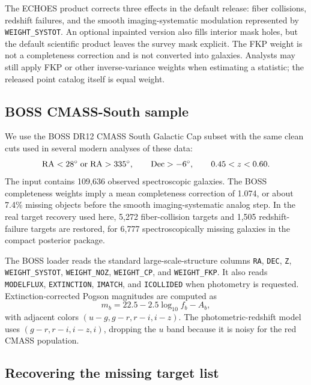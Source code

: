 \documentclass[apj]{emulateapj}
\begin{document}
The ECHOES product corrects three effects in the default release: fiber collisions,
redshift failures, and the smooth imaging-systematic modulation represented by
\texttt{WEIGHT\_SYSTOT}.  An optional inpainted version also fills interior mask
holes, but the default scientific product leaves the survey mask explicit.  The
FKP weight \citep{FKP1994} is not a completeness correction and is not converted
into galaxies.  Analysts may still apply FKP or other inverse-variance weights
when estimating a statistic; the released point catalog itself is equal weight.

\subsection{BOSS CMASS-South sample}
\label{subsec:bossdata}

We use the BOSS DR12 CMASS South Galactic Cap subset with the same clean cuts
used in several modern analyses of these data:
\begin{equation}
  {\rm RA}<28^\circ \; {\rm or} \; {\rm RA}>335^\circ,\qquad
  {\rm Dec}>-6^\circ,\qquad
  0.45<z<0.60 .
\end{equation}
The input contains 109,636 observed spectroscopic galaxies.  The BOSS
completeness weights imply a mean completeness correction of 1.074, or about
7.4\% missing objects before the smooth imaging-systematic analog step.  In the
real target recovery used here, 5,272 fiber-collision targets and 1,505
redshift-failure targets are restored, for 6,777 spectroscopically missing
galaxies in the compact posterior package.

The BOSS loader reads the standard large-scale-structure columns
\texttt{RA}, \texttt{DEC}, \texttt{Z}, \texttt{WEIGHT\_SYSTOT},
\texttt{WEIGHT\_NOZ}, \texttt{WEIGHT\_CP}, and \texttt{WEIGHT\_FKP}.  It also
reads \texttt{MODELFLUX}, \texttt{EXTINCTION}, \texttt{IMATCH}, and
\texttt{ICOLLIDED} when photometry is requested.  Extinction-corrected
Pogson magnitudes are computed as
\begin{equation}
  m_b = 22.5 - 2.5\log_{10} f_b - A_b,
\end{equation}
with adjacent colors $(u-g,g-r,r-i,i-z)$.  The photometric-redshift model uses
$(g-r,r-i,i-z,i)$, dropping the $u$ band because it is noisy for the red CMASS
population.

\subsection{Recovering the missing target list}
\label{subsec:targets}
\end{document}
